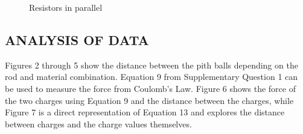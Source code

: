\documentclass [12pt, letterpaper, twoside] {article}
\begin{document}
\begin{figure}
  \centering
  \qquad
  \caption{Resistors in parallel}
\end{figure}

\subsection* {ANALYSIS OF DATA}
Figures 2 through 5 show the distance between the pith balls depending on the rod and material combination. Equation 9 from Supplementary Question 1 can be used to measure the force from Coulomb's Law. Figure 6 shows the force of the two charges using Equation 9 and the distance between the charges, while Figure 7 is a direct representation of Equation 13 and explores the distance between charges and the charge values themselves. \\
\end{document}

